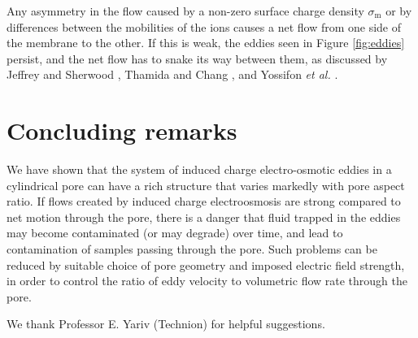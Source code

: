 Any asymmetry in the flow caused by a non-zero
surface charge density $\sigma_\text{m}$
or by differences between the mobilities of the ions causes a net flow from
one side of the membrane to the other. If this is weak, the eddies
seen in Figure \ref{fig:eddies} persist, and the net flow has to snake its
way between them, as discussed by Jeffrey and Sherwood \cite{jeffrey1980},
Thamida and Chang \cite{Thamida2002}, and Yossifon {\it et al.}
\cite{Yosifon2006}.


\section{Concluding remarks}

We have shown that the system of induced charge electro-osmotic eddies
in a cylindrical pore can have a rich structure that varies markedly
with pore aspect ratio. If flows created by induced charge electroosmosis
are strong
compared to net motion through the pore, there is a danger that
fluid trapped in the eddies may become contaminated (or may degrade)
over time, and lead to contamination of samples passing through the pore.
Such problems can be reduced by suitable choice of
pore geometry and imposed electric field strength, in order to control the
ratio of eddy velocity to volumetric flow rate through the pore.

We thank Professor E. Yariv (Technion) for helpful suggestions.
